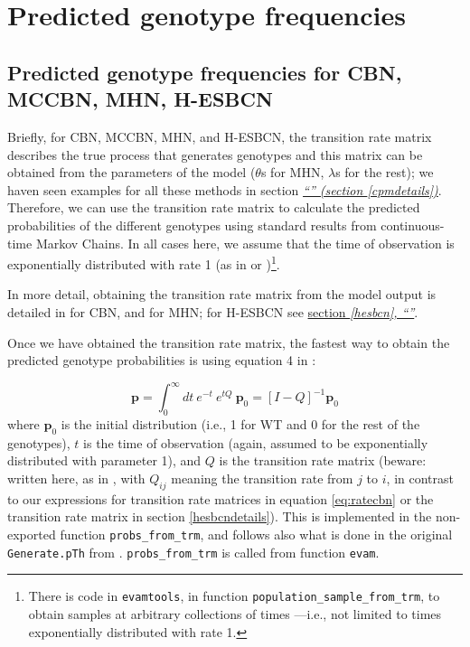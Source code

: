 \documentclass[a4paper,11pt]{article}
\newcommand*{\qref}[1]{\hyperref[{#1}]{\textit{``\nameref*{#1}'' (section \ref*{#1})}}}
\newcommand*{\qrefS}[1]{\hyperref[{#1}]{section \textit{\ref*{#1},
      ``\nameref*{#1}''}}}
\begin{document}
\section{Predicted genotype frequencies}
\label{pred-gen-freq}

\subsection{Predicted genotype frequencies for CBN, MCCBN, MHN, H-ESBCN}
\label{predicted-cbn-et-al}

Briefly, for CBN, MCCBN, MHN, and H-ESBCN, the transition rate matrix describes the true process that generates genotypes and this matrix can be obtained from the parameters of the model ($\theta$s for MHN, $\lambda$s for the rest); we haven seen examples for all these methods in section \qref{cpmdetails}. Therefore, we can use the transition rate matrix to calculate the predicted probabilities of the different genotypes using standard results from continuous-time Markov Chains. In all cases here, we assume that the time of observation is exponentially distributed with rate 1 (as in \citealp{gerstung2009quantifying} or \citealp{schill2020modelling})\footnote{There is code in \texttt{evamtools}, in function \texttt{population\_sample\_from\_trm}, to obtain samples at arbitrary collections of times ---i.e., not limited to  times exponentially distributed  with rate 1.}.


In more detail, obtaining the transition rate matrix from the model output is detailed in \cite{montazeri2016large} for CBN, and \cite{schill2020modelling} for MHN; for H-ESBCN see \qrefS{hesbcn}.


Once we have obtained the transition rate matrix, the fastest way to obtain the predicted genotype probabilities is using equation 4 in
\cite{schill2020modelling}:

\begin{equation}
\mathbf{p} = \int_{0}^{\infty} dt \ e^{-t} \ e^{t Q}\ \mathbf{p}_0 = [I - Q]^{-1} \mathbf{p}_0
\end{equation}
where $\mathbf{p}_0$ is the initial distribution (i.e., 1 for WT and 0 for the rest of the genotypes), $t$ is the time of observation (again, assumed to be exponentially distributed with parameter 1), and $Q$ is the transition rate matrix (beware: written here, as in \citealp{schill2020modelling}, with $Q_{ij}$ meaning the transition rate from $j$ to $i$, in contrast to our expressions for transition rate matrices in equation \ref{eq:ratecbn} or the transition rate matrix in section \ref{hesbcndetails}). This is implemented in the non-exported function \texttt{probs\_from\_trm}, and follows also what is done in the original \texttt{Generate.pTh} from \cite{schill2020modelling}. \texttt{probs\_from\_trm} is called from function \texttt{evam}.
\end{document}
